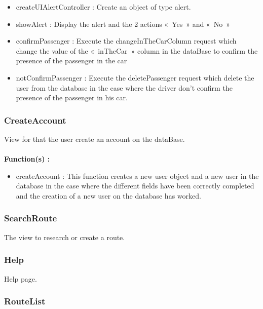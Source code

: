 \begin{itemize}
\item createUIAlertController : Create an object of type alert.	

\item showAlert : Display the alert and the 2 actions « Yes » and « No »

\item confirmPassenger : Execute the changeInTheCarColumn request which change the value of the « inTheCar » 		column in the dataBase to confirm the presence of the passenger in the car

\item notConfirmPassenger : Execute the deletePassenger request which delete the user from the database in the case 		where the driver don’t confirm the presence of the passenger in his car.
\end{itemize}

\subsubsection{CreateAccount}

View for that the user create an account on the dataBase.
\\\\
\textbf{Function(s) :}

\begin{itemize}
\item createAccount : This function creates a new user object and a new user in the database in the case where the different fields have been correctly completed and the creation of a new user on the database has worked.
\end{itemize}

\subsubsection{SearchRoute}

The view to research or create a route.

\subsubsection{Help}

Help page.

\subsubsection{RouteList}

